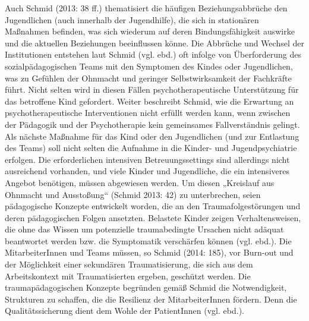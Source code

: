 Auch Schmid (2013: 38 ff.) thematisiert die häufigen Beziehungsabbrüche den Jugendlichen (auch innerhalb der Jugendhilfe), die sich in stationären Maßnahmen befinden, was sich wiederum auf deren Bindungsfähigkeit auswirke und die aktuellen Beziehungen beeinflussen könne. Die Abbrüche und Wechsel der Institutionen entstehen laut Schmid (vgl. ebd.) oft infolge von Überforderung des sozialpädagogischen Teams mit den Symptomen des Kindes oder Jugendlichen, was zu Gefühlen der Ohnmacht und geringer Selbstwirksamkeit der Fachkräfte führt. Nicht selten wird in diesen Fällen psychotherapeutische Unterstützung für das betroffene Kind gefordert. Weiter beschreibt Schmid, wie die Erwartung an psychotherapeutische Interventionen nicht erfüllt werden kann, wenn zwischen der Pädagogik und der Psychotherapie kein gemeinsames Fallverständnis gelingt. Als nächste Maßnahme für das Kind oder den Jugendlichen (und zur Entlastung des Teams) soll nicht selten die Aufnahme in die Kinder- und Jugendpsychiatrie erfolgen. Die erforderlichen intensiven Betreuungssettings sind allerdings nicht ausreichend vorhanden, und viele Kinder und Jugendliche, die ein intensiveres Angebot benötigen, müssen abgewiesen werden. Um diesen „Kreislauf aus Ohnmacht und Ausstoßung“ (Schmid 2013: 42) zu unterbrechen, seien pädagogische Konzepte entwickelt worden, die an den Traumafolgestörungen und deren pädagogischen Folgen ansetzten. Belastete Kinder zeigen Verhaltensweisen, die ohne das Wissen um potenzielle traumabedingte Ursachen nicht adäquat beantwortet werden bzw. die Symptomatik verschärfen können (vgl. ebd.). Die MitarbeiterInnen und Teams müssen, so Schmid (2014: 185), vor Burn-out und der Möglichkeit einer sekundären Traumatisierung, die sich aus dem Arbeitskontext mit Traumatisierten ergeben, geschützt werden. Die traumapädagogischen Konzepte begründen gemäß Schmid die Notwendigkeit, Strukturen zu schaffen, die die Resilienz der MitarbeiterInnen fördern. Denn die Qualitätssicherung dient dem Wohle der PatientInnen (vgl. ebd.).

